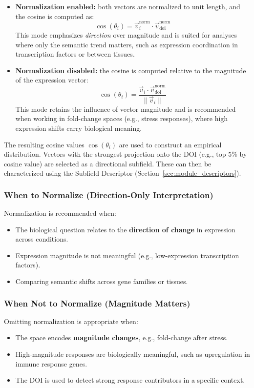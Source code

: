 \documentclass{article}
\begin{document}
\begin{itemize}
    \item \textbf{Normalization enabled:} both vectors are normalized to unit length, and the cosine is computed as:
    \[
    \cos(\theta_i) = \vec{v}_i^{\text{norm}} \cdot \vec{v}_{\text{doi}}^{\text{norm}}
    \]
    This mode emphasizes \emph{direction} over magnitude and is suited for analyses where only the semantic trend matters, such as expression coordination in transcription factors or between tissues.

    \item \textbf{Normalization disabled:} the cosine is computed relative to the magnitude of the expression vector:
    \[
    \cos(\theta_i) = \frac{\vec{v}_i \cdot \vec{v}_{\text{doi}}^{\text{norm}}}{\|\vec{v}_i\|}
    \]
    This mode retains the influence of vector magnitude and is recommended when working in fold-change spaces (e.g., stress responses), where high expression shifts carry biological meaning.
\end{itemize}

The resulting cosine values \( \cos(\theta_i) \) are used to construct an empirical distribution. Vectors with the strongest projection onto the DOI (e.g., top 5\% by cosine value) are selected as a directional subfield. These can then be characterized using the Subfield Descriptor (Section~\ref{sec:module_descriptors}).

\subsubsection{When to Normalize (Direction-Only Interpretation)}

Normalization is recommended when:
\begin{itemize}
    \item The biological question relates to the \textbf{direction of change} in expression across conditions.
    \item Expression magnitude is not meaningful (e.g., low-expression transcription factors).
    \item Comparing semantic shifts across gene families or tissues.
\end{itemize}

\subsubsection{When Not to Normalize (Magnitude Matters)}

Omitting normalization is appropriate when:
\begin{itemize}
    \item The space encodes \textbf{magnitude changes}, e.g., fold-change after stress.
    \item High-magnitude responses are biologically meaningful, such as upregulation in immune response genes.
    \item The DOI is used to detect strong response contributors in a specific context.
\end{itemize}
\end{document}
